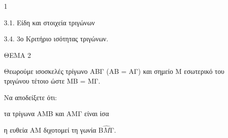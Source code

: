 \begin{ylh}{1}
    \item 3.1. Είδη και στοιχεία τριγώνων
    \item 3.4. 3ο Κριτήριο ισότητας τριγώνων.
\end{ylh}

ΘΕΜΑ 2

Θεωρούμε ισοσκελές τρίγωνο ΑΒΓ (ΑΒ = ΑΓ) και σημείο Μ εσωτερικό του τριγώνου τέτοιο ώστε ΜΒ = ΜΓ.

Να αποδείξετε ότι:

\begin{alist}
\item τα τρίγωνα ΑΜΒ και ΑΜΓ είναι ίσα 

\item η ευθεία ΑΜ διχοτομεί τη γωνία Β$\widehat{Μ}$Γ. 
\end{alist}
